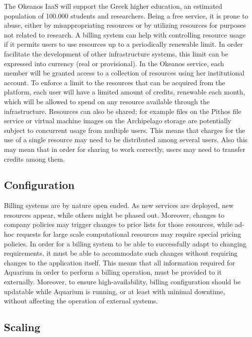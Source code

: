 \documentclass[preprint,10pt]{sigplanconf}
\begin{document}
The Okeanos IaaS will support the Greek higher education, an estimated
population of 100.000 students and researchers. Being a free service, it is
prone to abuse, either by misappropriating resources or by utilizing resources
for purposes not related to research. A billing system can help with
controlling resource usage if it permits users to use resources up to a
periodically renewable limit. In order facilitate the development of other
infrastructure systems, this limit can be expressed into currency (real or
provisional). In the Okeanos service, each member will be granted access to a
collection of resources using her institutional account. To enforce a limit to
the resources that can be acquired from the platform, each user will have a
limited amount of credits, renewable each month, which will be allowed to spend
on any resource available through the infrastructure. Resources can also be
shared; for example files on the Pithos file service or virtual machine images
on the Archipelago storage are potentially subject to concurrent usage from
multiple users. This means that charges for the use of a single resource may
need to be distributed among several users. Also this may mean that in order
for sharing to work correctly, users may need to transfer credits among them.


\subsection{Configuration}

Billing systems are by nature open ended. As new services are deployed, new
resources appear, while others might be phased out.  Moreover, changes to
company policies may trigger changes to price lists for those resources, while
ad-hoc requests for large scale computational resources may require special
pricing policies. In order for a billing system to be able to successfully
adapt to changing requirements, it must be able to accommodate such changes
without requiring changes to the application itself. This means that all
information required for Aquarium in order to perform a billing operation, must
be provided to it externally. Moreover, to ensure high-availability, billing
configuration should be updatable while Aquarium is running, or at least with
minimal downtime, without affecting the operation of external systems.


\subsection{Scaling}
\end{document}

